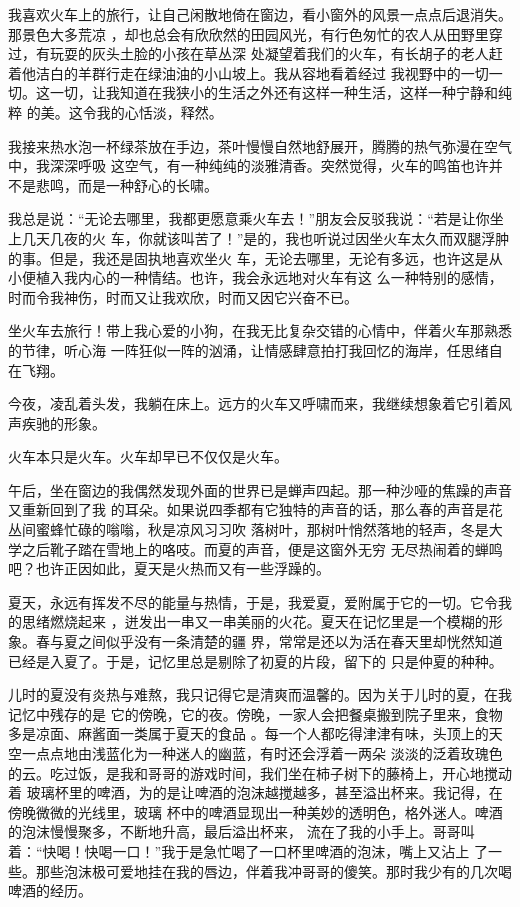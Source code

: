 \documentclass[12pt,a4paper]{article}
\begin{document}
		我喜欢火车上的旅行，让自己闲散地倚在窗边，看小窗外的风景一点点后退消失。那景色大多荒凉
	，却也总会有欣欣然的田园风光，有行色匆忙的农人从田野里穿过，有玩耍的灰头土脸的小孩在草丛深
	处凝望着我们的火车，有长胡子的老人赶着他洁白的羊群行走在绿油油的小山坡上。我从容地看着经过
	我视野中的一切一切。这一切，让我知道在我狭小的生活之外还有这样一种生活，这样一种宁静和纯粹
	的美。这令我的心恬淡，释然。

		我接来热水泡一杯绿茶放在手边，茶叶慢慢自然地舒展开，腾腾的热气弥漫在空气中，我深深呼吸
	这空气，有一种纯纯的淡雅清香。突然觉得，火车的鸣笛也许并不是悲鸣，而是一种舒心的长啸。

		我总是说：“无论去哪里，我都更愿意乘火车去！”朋友会反驳我说：“若是让你坐上几天几夜的火
	车，你就该叫苦了！”是的，我也听说过因坐火车太久而双腿浮肿的事。但是，我还是固执地喜欢坐火
	车，无论去哪里，无论有多远，也许这是从小便植入我内心的一种情结。也许，我会永远地对火车有这
	么一种特别的感情，时而令我神伤，时而又让我欢欣，时而又因它兴奋不已。

		坐火车去旅行！带上我心爱的小狗，在我无比复杂交错的心情中，伴着火车那熟悉的节律，听心海
	一阵狂似一阵的汹涌，让情感肆意拍打我回忆的海岸，任思绪自在飞翔。

		今夜，凌乱着头发，我躺在床上。远方的火车又呼啸而来，我继续想象着它引着风声疾驰的形象。

		火车本只是火车。火车却早已不仅仅是火车。

	\endwriting



		午后，坐在窗边的我偶然发现外面的世界已是蝉声四起。那一种沙哑的焦躁的声音又重新回到了我
	的耳朵。如果说四季都有它独特的声音的话，那么春的声音是花丛间蜜蜂忙碌的嗡嗡，秋是凉风习习吹
	落树叶，那树叶悄然落地的轻声，冬是大学之后靴子踏在雪地上的咯吱。而夏的声音，便是这窗外无穷
	无尽热闹着的蝉鸣吧？也许正因如此，夏天是火热而又有一些浮躁的。

		夏天，永远有挥发不尽的能量与热情，于是，我爱夏，爱附属于它的一切。它令我的思绪燃烧起来
	，迸发出一串又一串美丽的火花。夏天在记忆里是一个模糊的形象。春与夏之间似乎没有一条清楚的疆
	界，常常是还以为活在春天里却恍然知道已经是入夏了。于是，记忆里总是剔除了初夏的片段，留下的
	只是仲夏的种种。

		儿时的夏没有炎热与难熬，我只记得它是清爽而温馨的。因为关于儿时的夏，在我记忆中残存的是
	它的傍晚，它的夜。傍晚，一家人会把餐桌搬到院子里来，食物多是凉面、麻酱面一类属于夏天的食品
	。每一个人都吃得津津有味，头顶上的天空一点点地由浅蓝化为一种迷人的幽蓝，有时还会浮着一两朵
	淡淡的泛着玫瑰色的云。吃过饭，是我和哥哥的游戏时间，我们坐在柿子树下的藤椅上，开心地搅动着
	玻璃杯里的啤酒，为的是让啤酒的泡沫越搅越多，甚至溢出杯来。我记得，在傍晚微微的光线里，玻璃
	杯中的啤酒显现出一种美妙的透明色，格外迷人。啤酒的泡沫慢慢聚多，不断地升高，最后溢出杯来，
	流在了我的小手上。哥哥叫着：“快喝！快喝一口！”我于是急忙喝了一口杯里啤酒的泡沫，嘴上又沾上
	了一些。那些泡沫极可爱地挂在我的唇边，伴着我冲哥哥的傻笑。那时我少有的几次喝啤酒的经历。
\end{document}
